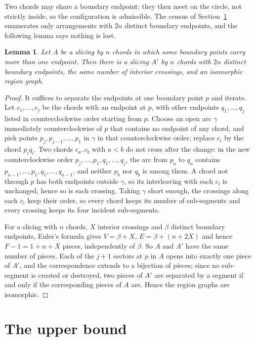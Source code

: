 \documentclass[11pt]{amsart}
\newtheorem{lemma}[theorem]{Lemma}
\theoremstyle{definition}
\theoremstyle{remark}
\begin{document}
Two chords may share a boundary endpoint: they then meet on the circle, not strictly
inside, so the configuration is admissible. The census of Section~\ref{sec:upper}
enumerates only arrangements with $2n$ distinct boundary endpoints, and the following
lemma says nothing is lost.

\begin{lemma}\label{lem:perturb}
Let $A$ be a slicing by $n$ chords in which some boundary points carry more than one
endpoint. Then there is a slicing $A'$ by $n$ chords with $2n$ distinct boundary
endpoints, the same number of interior crossings, and an isomorphic region graph.
\end{lemma}

\begin{proof}
It suffices to separate the endpoints at one boundary point $p$ and iterate. Let
$c_1,\ldots,c_j$ be the chords with an endpoint at $p$, with other endpoints
$q_1,\ldots,q_j$ listed in counterclockwise order starting from $p$. Choose an open arc
$\gamma$ immediately counterclockwise of $p$ that contains no endpoint of any chord, and
pick points $p_j,p_{j-1},\ldots,p_1$ in $\gamma$ in that counterclockwise order; replace
$c_i$ by the chord $p_iq_i$. Two chords $c_a,c_b$ with $a<b$ do not cross after the
change: in the new counterclockwise order
$p_j,\ldots,p_1,q_1,\ldots,q_j$, the arc from $p_a$ to $q_a$ contains
$p_{a-1},\ldots,p_1,q_1,\ldots,q_{a-1}$, and neither $p_b$ nor $q_b$ is among them. A
chord not through $p$ has both endpoints outside $\gamma$, so its interleaving with each
$c_i$ is unchanged, hence so is each crossing. Taking $\gamma$ short enough, the crossings
along each $c_i$ keep their order, so every chord keeps its number of sub-segments and
every crossing keeps its four incident sub-segments.

For a slicing with $n$ chords, $X$ interior crossings and $\beta$ distinct boundary
endpoints, Euler's formula gives $V=\beta+X$, $E=\beta+(n+2X)$ and hence
$F-1=1+n+X$ pieces, independently of $\beta$. So $A$ and $A'$ have the same number of
pieces. Each of the $j+1$ sectors at $p$ in $A$ opens into exactly one piece of $A'$, and
the correspondence extends to a bijection of pieces; since no sub-segment is created or
destroyed, two pieces of $A'$ are separated by a segment if and only if the corresponding
pieces of $A$ are. Hence the region graphs are isomorphic.
\end{proof}

\section{The upper bound}\label{sec:upper}
\end{document}
